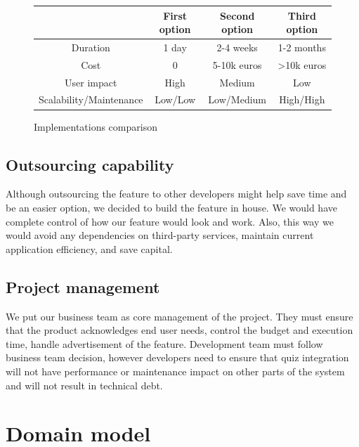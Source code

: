 \documentclass[
    english, %
]{VUMIFPSkursinis}
\begin{document}
\begin{figure}[ht]
    \centering
    \begin{tabular}{|c|c|c|c|}
        \hline
                                & First option & Second option & Third option \\
        \hline
        Duration                & 1 day        & 2-4 weeks     & 1-2 months   \\
        \hline
        Cost                    & 0            & 5-10k euros   & >10k euros   \\
        \hline
        User impact             & High         & Medium        & Low          \\
        \hline
        Scalability/Maintenance & Low/Low      & Low/Medium    & High/High    \\
        \hline
    \end{tabular}
    \caption{Implementations comparison}
    \label{tab:implementations-comparison}
\end{figure}

\subsection{Outsourcing capability}

Although outsourcing the feature to other developers might help save time and be an easier option, we decided to build the feature in house. We would have complete control of how our feature would look and work. Also, this way we would avoid any dependencies on third-party services, maintain current application efficiency, and save capital.

\subsection{Project management}

We put our business team as core management of the project. They must ensure that the product acknowledges end user needs, control the budget and execution time, handle advertisement of the feature. Development team must follow business team decision, however developers need to ensure that quiz integration will not have performance or maintenance impact on other parts of the system and will not result in technical debt.

\section{Domain model}
\end{document}
